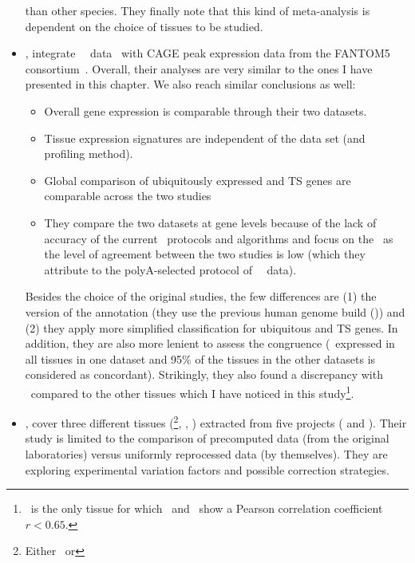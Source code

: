\begin{itemize}[topsep=0pt,nosep]
than other species.
They finally note that this kind of meta-analysis is dependent on
the choice of tissues to be studied.\mybr\
\item\hspace{-1mm}, integrate \uhlen\ \etal\ data~
with \gls{CAGE} peak expression data from the \gls{FANTOM5}
consortium~.
Overall, their analyses are very similar to the ones I have presented in this
chapter.
We also reach similar conclusions as well:
\begin{itemize}[nosep,topsep=0pt]
\item Overall gene expression is comparable through their two datasets.
\item Tissue expression signatures are independent of the data set (and profiling method).\mybr\
\item Global comparison of ubiquitously expressed and \gls{TS} genes are comparable
    across the two studies
\item They compare the two datasets at gene levels because of the lack of accuracy
    of the current \Rnaseq\ protocols and algorithms and focus on the \pcgs\
    as the level of agreement between the two studies is low
    (which they attribute to the polyA-selected protocol of \uhlen\ \etal\ data).\mybr\
\end{itemize}
Besides the choice of the original studies,
the few differences are (1) the version of the annotation
(they use the previous human genome build (\hg{37})) and
(2) they apply more simplified classification for ubiquitous and \gls{TS} genes.
In addition, they are also more lenient to assess the congruence
(\eg\ expressed in all tissues
in one dataset and 95\% of the tissues in the other datasets is considered as
concordant).
Strikingly, they also found a discrepancy with \salivary\ compared to the other tissues
which I have noticed in this study\footnote{\salivary\
is the only tissue for which \uhlen\ and \gtex\ show a Pearson correlation coefficient
$r<0.65$.}.\mybr\
\item\hspace{-1mm}, cover three different tissues
(\brain{}\footnote{Either \cortex\ or \hypothalamus}, \heart, \kidney)
extracted from five projects (\cite{Burge,VTpaper,Uhlen2015,Krupp2012} and \ibm).
Their study is limited to
the comparison of precomputed data (from the original laboratories)
versus uniformly reprocessed data (by themselves).
They are exploring experimental variation factors and possible correction strategies.

\end{itemize}
